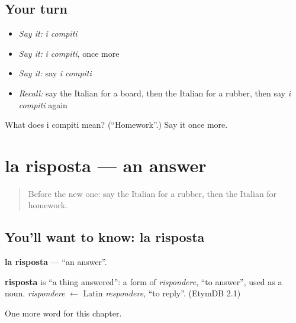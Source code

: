 \subsection*{Your turn}
\begin{itemize}
\raggedright
  \item \emph{Say it:} \emph{i compiti}
  \item \emph{Say it:} \emph{i compiti}, once more
  \item \emph{Say it:} say \emph{i compiti}
  \item \emph{Recall:} say the Italian for a board, then the Italian for a rubber, then say \emph{i compiti} again
\end{itemize}

\begin{tcolorbox}[breakable,colback=teal!4,colframe=teal!35!black,title={Before you move on}]
What does i compiti mean? (\textquotedblleft{}Homework\textquotedblright{}.) Say it once more.
\end{tcolorbox}
\section[la risposta]{la risposta — an answer}

\label{lesson:IT-C115-risposta}



\begin{quote}
Before the new one: say the Italian for a rubber, then the Italian for homework.
\end{quote}

\subsection*{You'll want to know: la risposta}
\textbf{la risposta} — \textquotedblleft{}an answer\textquotedblright{}.

\begin{cousinweb}
\textbf{risposta} is \textquotedblleft{}a thing answered\textquotedblright{}: a form of \emph{rispondere}, \textquotedblleft{}to answer\textquotedblright{}, used as a noun. \emph{rispondere} $\leftarrow$ Latin \emph{respondere}, \textquotedblleft{}to reply\textquotedblright{}. (EtymDB 2.1)
\end{cousinweb}

\begin{grammarlens}[title={What you've built}]
One more word for this chapter.
\end{grammarlens}

